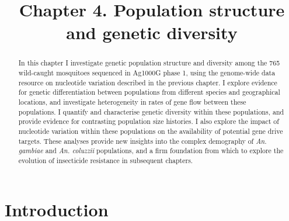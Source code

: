 \documentclass[a4paper,11pt,abstracton,hidelinks]{scrartcl}
\title{
Chapter 4. Population structure and genetic diversity
}
\author{}
\begin{document}
\renewcommand{\abstractname}{Summary}


\maketitle


\begin{abstract}


In this chapter I investigate genetic population structure and diversity among the 765 wild-caught mosquitoes sequenced in Ag1000G phase 1, using the genome-wide data resource on nucleotide variation described in the previous chapter.
%
I explore evidence for genetic differentiation between populations from different species and geographical locations, and investigate heterogeneity in rates of gene flow between these populations.
%
I quantify and characterise genetic diversity within these populations, and provide evidence for contrasting population size histories.
%
I also explore the impact of nucleotide variation within these populations on the availability of potential gene drive targets.
%
These analyses provide new insights into the complex demography of \textit{An. gambiae} and \textit{An. coluzzii} populations, and a firm foundation from which to explore the evolution of insecticide resistance in subsequent chapters.


\end{abstract}


\tableofcontents


\section{Introduction}\label{sec:introduction}
\end{document}
